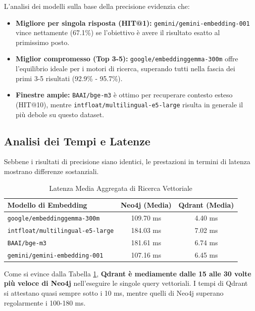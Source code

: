 L'analisi dei modelli sulla base della precisione evidenzia che:
\begin{itemize}
    \item \textbf{Migliore per singola risposta (HIT@1):} \texttt{gemini/gemini-embedding-001} vince nettamente (67.1\%) se l'obiettivo è avere il risultato esatto al primissimo posto.
    \item \textbf{Miglior compromesso (Top 3-5):} \texttt{google/embeddinggemma-300m} offre l'equilibrio ideale per i motori di ricerca, superando tutti nella fascia dei primi 3-5 risultati (92.9\% - 95.7\%).
    \item \textbf{Finestre ampie:} \texttt{BAAI/bge-m3} è ottimo per recuperare contesto esteso (HIT@10), mentre \texttt{intfloat/multilingual-e5-large} risulta in generale il più debole su questo dataset.
\end{itemize}

\subsection{Analisi dei Tempi e Latenze}
Sebbene i risultati di precisione siano identici, le prestazioni in termini di latenza mostrano differenze sostanziali.

\begin{table}[H]
    \centering
    \begin{tabular}{lcc}
        \toprule
        \textbf{Modello di Embedding} & \textbf{Neo4j (Media)} & \textbf{Qdrant (Media)} \\
        \midrule
        \texttt{google/embeddinggemma-300m} & 109.70 ms & 4.40 ms \\
        \texttt{intfloat/multilingual-e5-large} & 184.03 ms & 7.02 ms \\
        \texttt{BAAI/bge-m3} & 181.61 ms & 6.74 ms \\
        \texttt{gemini/gemini-embedding-001} & 107.16 ms & 6.45 ms \\
        \bottomrule
    \end{tabular}
    \caption{Latenza Media Aggregata di Ricerca Vettoriale}
    \label{tab:latenze}
\end{table}

Come si evince dalla Tabella \ref{tab:latenze}, \textbf{Qdrant è mediamente dalle 15 alle 30 volte più veloce di Neo4j} nell'eseguire le singole query vettoriali. I tempi di Qdrant si attestano quasi sempre sotto i 10 ms, mentre quelli di Neo4j superano regolarmente i 100-180 ms.


